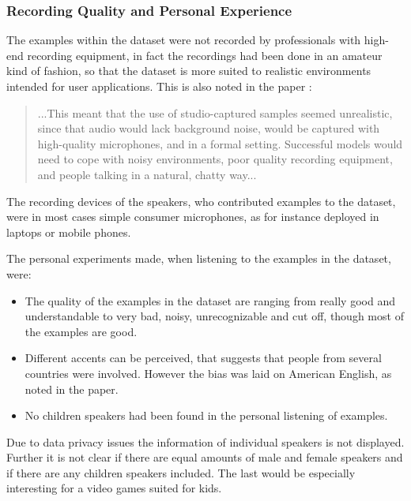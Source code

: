 \subsubsection{Recording Quality and Personal Experience}
The examples within the dataset were not recorded by professionals with high-end recording equipment, in fact the recordings had been done in an amateur kind of fashion, so that the dataset is more suited to realistic environments intended for user applications.
This is also noted in the paper \cite{Warden2018}:
\begin{quote}
...This meant that the use of studio-captured samples seemed unrealistic, since that audio would lack background noise, would be captured with high-quality microphones, and in a formal setting. 
Successful models would need to cope with noisy environments, poor quality recording equipment, and people talking in a natural, chatty way...
\end{quote}
The recording devices of the speakers, who contributed examples to the dataset, were in most cases simple consumer microphones, as for instance deployed in laptops or mobile phones.

The personal experiments made, when listening to the examples in the dataset, were:
\begin{itemize}
  \item The quality of the examples in the dataset are ranging from really good and understandable to very bad, noisy, unrecognizable and cut off, though most of the examples are good.

  \item Different accents can be perceived, that suggests that people from several countries were involved. 
  However the bias was laid on American English, as noted in the paper.

  \item No children speakers had been found in the personal listening of examples.
\end{itemize}

Due to data privacy issues the information of individual speakers is not displayed.
Further it is not clear if there are equal amounts of male and female speakers and if there are any children speakers included.
The last would be especially interesting for a video games suited for kids.

